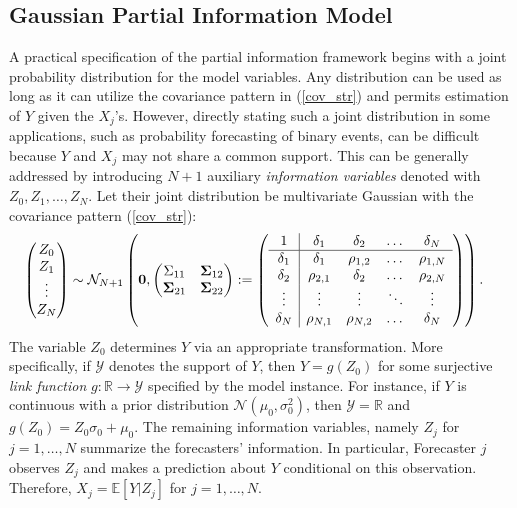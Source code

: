 \documentclass[11pt]{article}
\newcommand{\R}{\mathbb{R}}
\newcommand{\E}{\mathbb{E}}
\theoremstyle{definition}
\theoremstyle{definition}
\def\E{{\mathbb E}}
\begin{document}
\subsection{Gaussian Partial Information Model}
\label{gaussian}
A practical specification of the partial information framework begins with a joint probability distribution for the model variables. Any distribution can be used as long as it can utilize the covariance pattern in (\ref{cov_str}) and permits estimation of $Y$ given the $X_j$'s.  However, directly stating such a joint distribution in some applications, such as probability forecasting of binary events, can be difficult because $Y$ and $X_j$ may not share a common support. This can be generally addressed by introducing $N+1$ auxiliary \textit{information variables} denoted with $Z_0, Z_1, \dots, Z_N$. Let their joint distribution be multivariate Gaussian with the covariance pattern (\ref{cov_str}):
\begin{align}
\left(\begin{matrix} Z_0 \\ Z_{1}\\ \vdots \\ Z_{N} \end{matrix}\right) &\sim \mathcal{N}_{N+1}\left( 
 \boldsymbol{0}, \left(\begin{matrix} 
\Sigma_{11} & {\bf \Sigma}_{12}\\
{\bf \Sigma}_{21} & {\bf \Sigma}_{22}\\
 \end{matrix}\right) 
 :=
 \left(\begin{array}{c | c c cc }
1 & \delta_1 & \delta_2 & \dots & \delta_N  \\ \hline
\delta_1 & \delta_1 &\rho_{1,2} & \dots & \rho_{1,N}   \\ 
\delta_2 & \rho_{2,1} & \delta_2 & \dots & \rho_{2,N}  \\ 
\vdots & \vdots & \vdots & \ddots & \vdots  \\ 
\delta_N & \rho_{N,1} & \rho_{N,2} & \dots & \delta_N\\ 
 \end{array}\right)\right).  \label{NExperts}
\end{align}
The variable $Z_0$ determines $Y$ via an appropriate transformation. More specifically, if $\mathcal{Y}$ denotes the support of $Y$, then 
 $Y = g(Z_0)$ for some surjective \textit{link function} $g: \R \to \mathcal{Y}$ specified by the model instance. For instance, if $Y$ is continuous with a prior distribution $\mathcal{N}(\mu_0, \sigma^2_0)$, then $\mathcal{Y} = \R$ and $g(Z_0) = Z_0 \sigma_0 + \mu_0$. The remaining information variables, namely $Z_j$ for $j = 1, \dots, N$ summarize the forecasters' information. In particular, Forecaster $j$ observes $Z_j$ and makes a prediction about $Y$ conditional on this observation. Therefore, $X_j= \E[Y | Z_j]$ for $j = 1, \dots, N$. 
 
\end{document}

